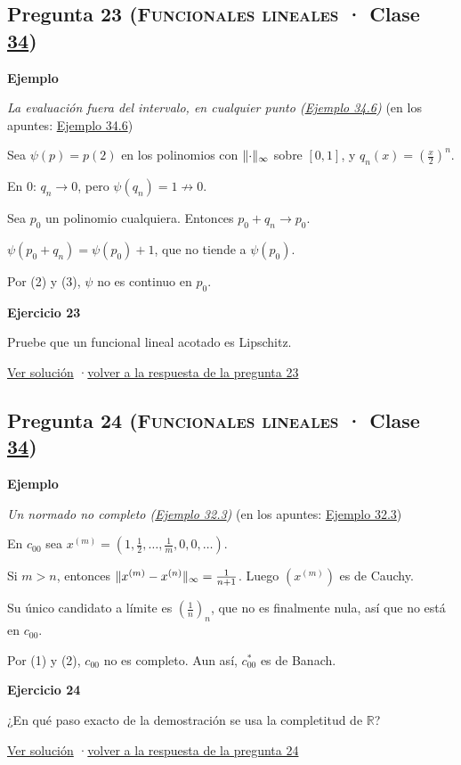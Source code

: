 \documentclass[11pt,a4paper]{article}
\newcommand{\R}{\mathbb{R}}\newcommand{\N}{\mathbb{N}}\newcommand{\Q}{\mathbb{Q}}
\newcommand{\bloque}[1]{\par\smallskip\noindent\textbf{\color{acento}#1}\par}
\begin{document}
\subsection*{\hypertarget{e-23}{}Pregunta 23 \normalfont\small(\textsc{Funcionales lineales} · Clase \href{https://decostruttivismo.github.io/MAT2514-repaso/pdf/MAT2514_apuntes_completos.pdf\#nameddest=section.34}{34})}
\bloque{Ejemplo}
\textit{La evaluación fuera del intervalo, en cualquier punto (\href{https://decostruttivismo.github.io/MAT2514-repaso/pdf/MAT2514_apuntes_completos.pdf\#nameddest=teorema.34.6}{Ejemplo 34.6})} {\small(en los apuntes: \href{https://decostruttivismo.github.io/MAT2514-repaso/pdf/MAT2514_apuntes_completos.pdf\#nameddest=teorema.34.6}{Ejemplo 34.6})}
\begin{pasos}
\item[] Sea $\psi(p)=p(2)$ en los polinomios con $\lVert \cdot\rVert_\infty$ sobre $[0,1]$, y $q_n(x)=(\frac x2)^n$.
\item[(1)] En $0$: $q_n\to0$, pero $\psi(q_n)=1\not\to0$.
\item[(2)] Sea $p_0$ un polinomio cualquiera. Entonces $p_0+q_n\to p_0$.
\item[(3)] $\psi(p_0+q_n)=\psi(p_0)+1$, que no tiende a $\psi(p_0)$.
\item[] Por (2) y (3), $\psi$ no es continuo en $p_0$.
\end{pasos}
\bloque{\hypertarget{x-23}{}Ejercicio 23}
Pruebe que un funcional lineal acotado es Lipschitz.
\par{\small \hyperlink{s-23}{Ver solución} \quad·\quad \hyperlink{r-23}{volver a la respuesta de la pregunta 23}}
\subsection*{\hypertarget{e-24}{}Pregunta 24 \normalfont\small(\textsc{Funcionales lineales} · Clase \href{https://decostruttivismo.github.io/MAT2514-repaso/pdf/MAT2514_apuntes_completos.pdf\#nameddest=section.34}{34})}
\bloque{Ejemplo}
\textit{Un normado no completo (\href{https://decostruttivismo.github.io/MAT2514-repaso/pdf/MAT2514_apuntes_completos.pdf\#nameddest=teorema.32.3}{Ejemplo 32.3})} {\small(en los apuntes: \href{https://decostruttivismo.github.io/MAT2514-repaso/pdf/MAT2514_apuntes_completos.pdf\#nameddest=teorema.32.3}{Ejemplo 32.3})}
\begin{pasos}
\item[] En $c_{00}$ sea $x^{(m)}=(1,\frac12,\dots,\frac1m,0,0,\dots)$.
\item[(1)] Si $m\gt n$, entonces $\lVert x^{(m)}-x^{(n)}\rVert_\infty=\frac1{n+1}$. Luego $(x^{(m)})$ es de Cauchy.
\item[(2)] Su único candidato a límite es $(\frac1n)_n$, que no es finalmente nula, así que no está en $c_{00}$.
\item[] Por (1) y (2), $c_{00}$ no es completo. Aun así, $c_{00}^*$ es de Banach.
\end{pasos}
\bloque{\hypertarget{x-24}{}Ejercicio 24}
¿En qué paso exacto de la demostración se usa la completitud de $\R$?
\par{\small \hyperlink{s-24}{Ver solución} \quad·\quad \hyperlink{r-24}{volver a la respuesta de la pregunta 24}}
\end{document}
